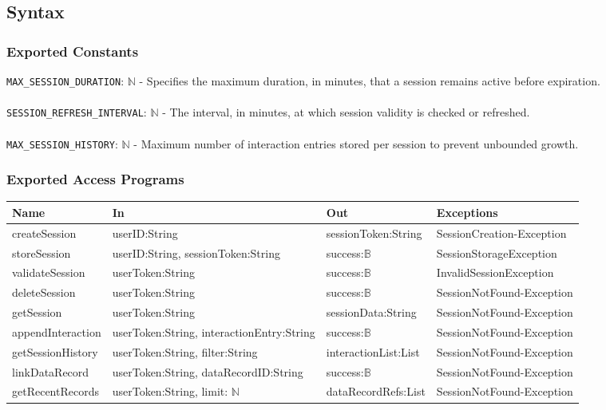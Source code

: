 \documentclass[12pt, titlepage]{article}
\newcommand{\Bool}{\ensuremath{\mathbb{B}}}
\begin{document}
\subsection{Syntax}

\subsubsection{Exported Constants}
\texttt{MAX\_SESSION\_DURATION}: $\mathbb{N}$ - Specifies the maximum
duration, in minutes, that a session remains active before expiration. \\ \\
\texttt{SESSION\_REFRESH\_INTERVAL}: $\mathbb{N}$ - The interval, in
minutes, at which session validity is checked or refreshed. \\ \\
\texttt{MAX\_SESSION\_HISTORY}: $\mathbb{N}$ - Maximum number of
interaction entries stored per session to prevent unbounded growth. \\

\subsubsection{Exported Access Programs}

\begin{center}
  \begin{tabular}{p{3.3cm} p{4.5cm} p{3.2cm} p{4cm}}
    \hline
    \textbf{Name} & \textbf{In} & \textbf{Out} & \textbf{Exceptions} \\
    \hline
    createSession & userID:String & sessionToken:String &
    SessionCreation-Exception \\
    \hline
    storeSession & userID:String, sessionToken:String & success:\Bool
    & SessionStorageException \\
    \hline
    validateSession & userToken:String & success:\Bool &
    InvalidSessionException \\
    \hline
    deleteSession & userToken:String & success:\Bool &
    SessionNotFound-Exception \\
    \hline
    getSession & userToken:String & sessionData:String&
    SessionNotFound-Exception \\
    \hline
    appendInteraction & userToken:String, interactionEntry:String &
    success:\Bool & SessionNotFound-Exception \\
    \hline
    getSessionHistory & userToken:String, filter:String &
    interactionList:List & SessionNotFound-Exception \\
    \hline
    linkDataRecord & userToken:String, dataRecordID:String &
    success:\Bool & SessionNotFound-Exception \\
    \hline
    getRecentRecords & userToken:String, limit: $\mathbb{N}$ &
    dataRecordRefs:List & SessionNotFound-Exception \\
    \hline
  \end{tabular}
\end{center}
\end{document}
